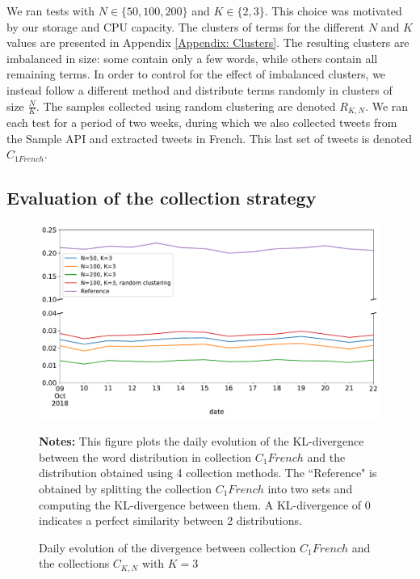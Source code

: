  We ran tests with $N \in \{50, 100, 200\}$ and $K \in \{2,3\}$. This choice was motivated by our storage and CPU capacity. The clusters of terms for the different $N$ and $K$ values are presented in Appendix \ref{Appendix: Clusters}. The resulting clusters are imbalanced in size: some contain only a few words, while others contain all remaining terms. In order to control for the effect of imbalanced clusters, we instead follow a different method and distribute terms randomly in clusters of size $\frac{N}{K}$. The samples collected using random clustering are denoted $R_{K,N}$. We ran each test for a period of two weeks, during which we also collected tweets from the Sample API and extracted tweets in French. This last set of tweets is denoted $C_{1 French}$.
			
			\subsection{Evaluation of the collection strategy \label{SubSec: evaluation_of_collection}}
			
\begin{figure}
\begin{center}
\includegraphics[scale=.5]{figures/KL_K=3.pdf}
\end{center}
{\scriptsize \textbf{Notes:} This figure plots the daily evolution of the KL-divergence between the word distribution in collection $C_1 French$ and the distribution obtained using 4 collection methods. The ``Reference" is obtained by splitting the collection $C_1 French$ into two sets and computing the KL-divergence between them. A KL-divergence of 0 indicates a perfect similarity between 2 distributions.}
\caption{Daily evolution of the divergence between collection $C_1 French$ and the collections $C_{K,N}$ with $K = 3$}
\label{Figure:KL_K=3}
\end{figure}

